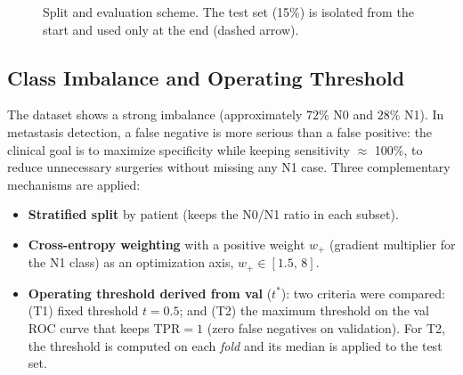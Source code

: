 \documentclass[10pt,a4paper,twocolumn,twoside]{article}
\begin{document}
\begin{figure}[h]
\centering
{}%
\caption{Split and evaluation scheme. The test set (15\%) is isolated from the start and used only
at the end (dashed arrow).}
\label{fig:split-scheme}
\end{figure}

\subsection{Class Imbalance and Operating Threshold}

The dataset shows a strong imbalance (approximately $72\%$ N0 and $28\%$ N1). In metastasis detection, a
false negative is more serious than a false positive: the clinical goal is to maximize
specificity while keeping sensitivity $\approx$ 100\%, to reduce unnecessary surgeries
without missing any N1 case. Three complementary mechanisms are applied:
\begin{itemize}\itemsep1pt
  \item \textbf{Stratified split} by patient (keeps the N0/N1 ratio in each subset).
  \item \textbf{Cross-entropy weighting} with a positive weight $w_+$ (gradient
        multiplier for the N1 class) as an optimization axis, $w_+ \in [1.5,\,8]$.
  \item \textbf{Operating threshold derived from val} ($t^*$): two criteria were compared:
        (T1) fixed threshold $t\!=\!0.5$; and (T2) the maximum threshold on the val ROC curve that
        keeps TPR$\!=\!1$ (zero false negatives on validation). For T2, the
        threshold is computed on each \textit{fold} and its median is applied to the test set.
\end{itemize}
\end{document}
